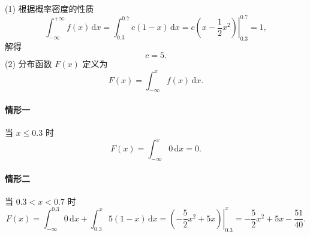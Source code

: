 \documentclass{article}
\begin{document}
\begin{solution}
    (1) 根据概率密度的性质
    $$
        \int_{-\infty}^{+\infty} f(x) \,\mathrm{d}x
        = \int_{0.3}^{0.7} c(1-x) \,\mathrm{d}x
        = \left.c\left(x-\frac{1}{2}x^2\right)\right|_{0.3}^{0.7}
        = 1,
    $$
    解得
    $$
        c = 5.
    $$
    (2) 分布函数 $F(x)$ 定义为
    $$
        F(x) = \int_{-\infty}^{x} f(x) \,\mathrm{d}x.
    $$
    \paragraph{情形一} 当 $x \leqslant 0.3$ 时
    $$
        F(x) = \int_{-\infty}^{x} 0 \,\mathrm{d}x = 0.
    $$
    \paragraph{情形二} 当 $0.3<x<0.7$ 时
    $$
        F(x) = \int_{-\infty}^{0.3} 0\,\mathrm{d}x + \int_{0.3}^x 5(1-x)\,\mathrm{d}x
        = \left.\left(-\frac{5}{2}x^2 + 5x\right)\right|_{0.3}^{x}
        = -\frac{5}{2}x^2 + 5x - \frac{51}{40}.
    $$

\end{solution}
\end{document}
